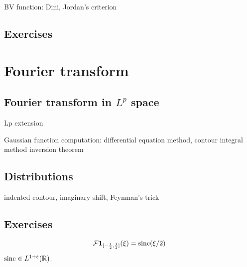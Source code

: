 \documentclass{../../large}
\begin{document}
BV function: Dini, Jordan's criterion
\begin{prb}
\end{prb}





\section*{Exercises}
\begin{prb}
\end{prb}
\begin{prb}
\end{prb}









\chapter{Fourier transform}
\section{Fourier transform in $L^p$ space}
\begin{prb}
\end{prb}
Lp extension

Gaussian function computation: differential equation method, contour integral method
inversion theorem
\begin{prb}
\end{prb}

\section{Distributions}
\begin{prb}
indented contour, imaginary shift, Feynman's trick
\end{prb}







\section*{Exercises}
\begin{prb}
\[\mathcal{F}\mathbf{1}_{[-\frac12,\frac12]}(\xi)=\operatorname{sinc}(\xi/2)\]
$\operatorname{sinc}\in L^{1+\varepsilon}(\mathbb{R})$.
\end{prb}
\begin{prb}
\end{prb}
\begin{prb}
\end{prb}
\end{document}
